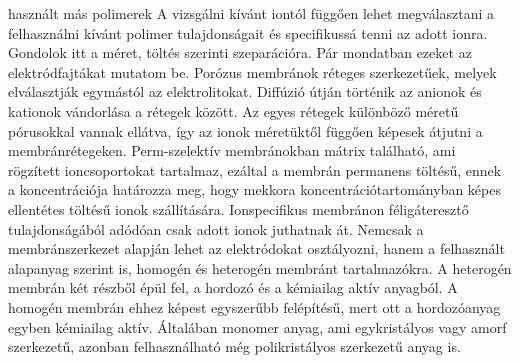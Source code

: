 { használt más polimerek
 A vizsgálni kívánt iontól függően lehet megválasztani a felhasználni kívánt polimer tulajdonságait és specifikussá tenni az adott ionra. Gondolok itt a méret, töltés szerinti szeparációra.  Pár mondatban ezeket az elektródfajtákat mutatom be.
Porózus membránok réteges szerkezetűek, melyek elválasztják egymástól az elektrolitokat. Diffúzió útján történik az anionok és kationok vándorlása a rétegek között. Az egyes rétegek különböző méretű pórusokkal vannak ellátva, így az ionok méretüktől függően képesek átjutni a membránrétegeken. 
Perm-szelektív membránokban mátrix található, ami rögzített ioncsoportokat tartalmaz, ezáltal a membrán permanens töltésű, ennek a koncentrációja határozza meg, hogy mekkora koncentrációtartományban képes ellentétes töltésű ionok szállítására. Ionspecifikus membránon féligáteresztő tulajdonságából adódóan csak adott ionok juthatnak át. 
Nemcsak a membránszerkezet alapján lehet az elektródokat osztályozni, hanem a felhasznált alapanyag szerint is, homogén és heterogén membránt tartalmazókra. A heterogén membrán két részből épül fel, a hordozó és a kémiailag aktív anyagból. A homogén membrán ehhez képest egyszerűbb felépítésű, mert ott a hordozóanyag egyben kémiailag aktív. Általában monomer anyag, ami egykristályos vagy amorf szerkezetű, azonban felhasználható még polikristályos szerkezetű anyag is. 

}
